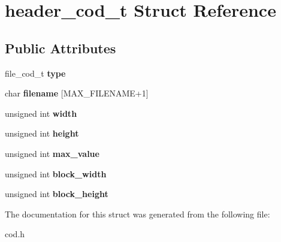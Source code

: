 \hypertarget{structheader__cod__t}{}\section{header\+\_\+cod\+\_\+t Struct Reference}
\label{structheader__cod__t}
\subsection*{Public Attributes}
\begin{DoxyCompactItemize}
\item 
\hypertarget{structheader__cod__t_a2aab6f87a7ed7cabbab5745d0d40fa73}{}file\+\_\+cod\+\_\+t {\bfseries type}\label{structheader__cod__t_a2aab6f87a7ed7cabbab5745d0d40fa73}

\item 
\hypertarget{structheader__cod__t_a909f2df31f0819bcd4b28952736e42dc}{}char {\bfseries filename} \mbox{[}M\+A\+X\+\_\+\+F\+I\+L\+E\+N\+A\+M\+E+1\mbox{]}\label{structheader__cod__t_a909f2df31f0819bcd4b28952736e42dc}

\item 
\hypertarget{structheader__cod__t_a359dbc4f40b94c364950d1dcead14edd}{}unsigned int {\bfseries width}\label{structheader__cod__t_a359dbc4f40b94c364950d1dcead14edd}

\item 
\hypertarget{structheader__cod__t_a4c7a3059cff856f63589907ddc192b2f}{}unsigned int {\bfseries height}\label{structheader__cod__t_a4c7a3059cff856f63589907ddc192b2f}

\item 
\hypertarget{structheader__cod__t_a49595b75b282bd1c506e953adcfa1e2e}{}unsigned int {\bfseries max\+\_\+value}\label{structheader__cod__t_a49595b75b282bd1c506e953adcfa1e2e}

\item 
\hypertarget{structheader__cod__t_a61f2e0574f4b9323be37e196e5a28ce9}{}unsigned int {\bfseries block\+\_\+width}\label{structheader__cod__t_a61f2e0574f4b9323be37e196e5a28ce9}

\item 
\hypertarget{structheader__cod__t_a77552c9b6e7cc18b21a2c613cee591b1}{}unsigned int {\bfseries block\+\_\+height}\label{structheader__cod__t_a77552c9b6e7cc18b21a2c613cee591b1}

\end{DoxyCompactItemize}


The documentation for this struct was generated from the following file\+:\begin{DoxyCompactItemize}
\item 
cod.\+h\end{DoxyCompactItemize}
